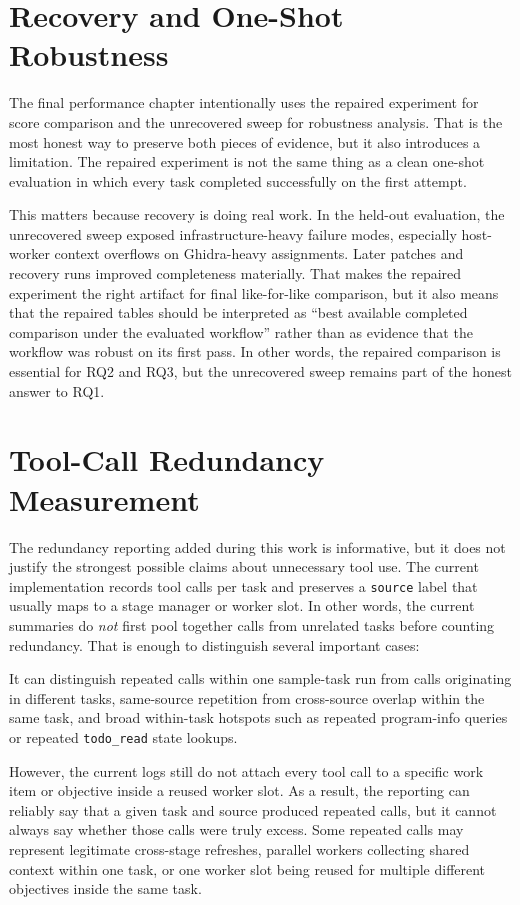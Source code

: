 \section{Recovery and One-Shot Robustness}

The final performance chapter intentionally uses the repaired experiment for score comparison and the unrecovered sweep for robustness analysis. That is the most honest way to preserve both pieces of evidence, but it also introduces a limitation. The repaired experiment is not the same thing as a clean one-shot evaluation in which every task completed successfully on the first attempt.

This matters because recovery is doing real work. In the held-out evaluation, the unrecovered sweep exposed infrastructure-heavy failure modes, especially host-worker context overflows on Ghidra-heavy assignments. Later patches and recovery runs improved completeness materially. That makes the repaired experiment the right artifact for final like-for-like comparison, but it also means that the repaired tables should be interpreted as ``best available completed comparison under the evaluated workflow'' rather than as evidence that the workflow was robust on its first pass. In other words, the repaired comparison is essential for RQ2 and RQ3, but the unrecovered sweep remains part of the honest answer to RQ1.

\section{Tool-Call Redundancy Measurement}

The redundancy reporting added during this work is informative, but it does not justify the strongest possible claims about unnecessary tool use. The current implementation records tool calls per task and preserves a \texttt{source} label that usually maps to a stage manager or worker slot. In other words, the current summaries do \emph{not} first pool together calls from unrelated tasks before counting redundancy. That is enough to distinguish several important cases:

It can distinguish repeated calls within one sample-task run from calls originating in different tasks, same-source repetition from cross-source overlap within the same task, and broad within-task hotspots such as repeated program-info queries or repeated \texttt{todo\_read} state lookups.

However, the current logs still do not attach every tool call to a specific work item or objective inside a reused worker slot. As a result, the reporting can reliably say that a given task and source produced repeated calls, but it cannot always say whether those calls were truly excess. Some repeated calls may represent legitimate cross-stage refreshes, parallel workers collecting shared context within one task, or one worker slot being reused for multiple different objectives inside the same task.

